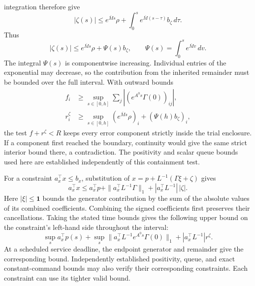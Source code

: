 \documentclass[preprint,12pt]{elsarticle}
\begin{document}
integration therefore give
\[
 |\zeta(s)|\le e^{\overline M s}\rho+
             \int_0^s e^{\overline M(s-\tau)}b_\zeta\,d\tau.
\]
Thus
\begin{equation}
 |\zeta(s)|\le e^{\overline{M}s}\rho+\Psi(s)b_\zeta,
 \qquad \Psi(s)=\int_0^s e^{\overline{M}v}\,dv.
 \label{eq:structure-remainder-bound}
\end{equation}
The integral $\Psi(s)$ is componentwise increasing. Individual entries
of the exponential may decrease, so the contribution from the inherited
remainder must be bounded over the full interval. With outward bounds
\begin{equation}
 \begin{aligned}
 f_i&\ge\sup_{s\in[0,h]}\sum_j|(e^{A^0s}\Gamma(0))_{ij}|,\\
 r_i^\zeta&\ge\sup_{s\in[0,h]}(e^{\overline{M}s}\rho)_i
                            +(\Psi(h)b_\zeta)_i,
 \end{aligned}
 \label{eq:structure-continuous-radii}
\end{equation}
the test $f+r^\zeta<R$ keeps every error component strictly inside the
trial enclosure. If a component first reached the boundary, continuity
would give the same strict interior bound there, a contradiction. The
positivity and
scalar queue bounds used here are established independently of this
containment test.

For a constraint $a_x^\top x\le b_x$, substitution of
$x=p+L^{-1}(\Gamma\xi+\zeta)$ gives
\[
 a_x^\top x\le a_x^\top p+
 \|a_x^\top L^{-1}\Gamma\|_1+
 |a_x^\top L^{-1}|\,|\zeta|.
\]
Here $|\xi|\le\mathbf1$ bounds the generator contribution by the sum of the
absolute values of its combined coefficients. Combining the signed
coefficients first preserves their cancellations. Taking the stated time
bounds gives the following upper bound on the constraint's left-hand
side throughout the interval:
\begin{equation}
 \sup_s a_x^\top p(s)+
 \sup_s\|a_x^\top L^{-1}e^{A^0s}\Gamma(0)\|_1+
 |a_x^\top L^{-1}|r^\zeta.
 \label{eq:structure-signed-output}
\end{equation}
At a scheduled service deadline, the endpoint generator and remainder
give the corresponding bound. Independently established positivity,
queue, and exact constant-command bounds may also verify their
corresponding constraints. Each constraint can use its tighter valid bound.
\end{document}

